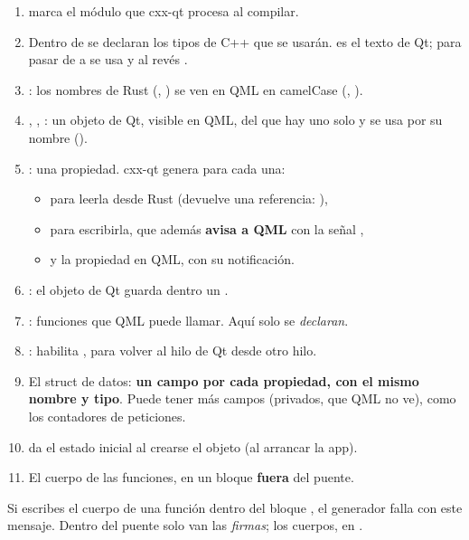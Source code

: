\begin{enumerate}
  \item {} marca el módulo que cxx-qt procesa al compilar.
  \item Dentro de  se declaran los tipos de C++ que se usarán.
   es el texto de Qt; para pasar de  a  se usa
   y al revés .
  \item {}: los nombres de Rust (, ) se
  ven en QML en camelCase (, ).
  \item \cod{#[qobject]}, , : un objeto de Qt,
  visible en QML, del que hay uno solo y se usa por su nombre ().
  \item {}: una propiedad. cxx-qt genera para cada una:
  \begin{itemize}
    \item {} para leerla desde Rust (devuelve una referencia: ),
    \item {} para escribirla, que además \textbf{avisa a QML} con la señal
    ,
    \item y la propiedad  en QML, con su notificación.
  \end{itemize}
  \item {}: el objeto de Qt guarda dentro un
  .
  \item \cod{#[qinvokable]}: funciones que QML puede llamar. Aquí solo se \emph{declaran}.
  \item {}: habilita , para volver al hilo de Qt
  desde otro hilo.
  \item El struct de datos: \textbf{un campo por cada propiedad, con el mismo nombre y tipo}.
  Puede tener más campos (privados, que QML no ve), como los contadores de peticiones.
  \item {} da el estado inicial al crearse el objeto (al arrancar la app).
  \item El cuerpo de las funciones, en un bloque  \textbf{fuera}
  del puente.
\end{enumerate}

\begin{trampa}
Si escribes el cuerpo de una función dentro del bloque , el generador
falla con este mensaje. Dentro del puente solo van las \emph{firmas}; los cuerpos, en
.
\end{trampa}

